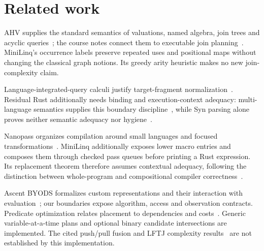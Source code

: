 \section{Related work}
\label{sec:related-work}
AHV supplies the standard semantics of valuations, named algebra, join trees
and acyclic queries~\cite{ahv}; the course notes connect them to executable
join planning~\cite{notes}. MiniLinq's occurrence labels preserve repeated
uses and positional maps without changing the classical graph notions.
Its greedy arity heuristic makes no new join-complexity claim.

Language-integrated-query calculi justify target-fragment
normalization~\cite{host-linq,host-effective}. Residual Rust additionally needs
binding and execution-context adequacy: multi-language semantics supplies this
boundary discipline~\cite{host-multilanguage}, while Syn parsing alone proves
neither semantic adequacy nor hygiene~\cite{host-hygiene}.

Nanopass organizes compilation around small languages and focused
transformations~\cite{paper-nanopass}. MiniLinq additionally exposes lower
macro entries and composes them through checked pass queues before printing
a Rust expression. Its replacement theorem
therefore assumes contextual adequacy, following the distinction between
whole-program and compositional compiler correctness~\cite{paper-ccc}.

Ascent BYODS formalizes custom representations and their interaction with
evaluation~\cite{paper-byods}; our boundaries expose algorithm, access and
observation contracts. Predicate optimization relates placement to dependencies
and costs~\cite{paper-udp}. Generic variable-at-a-time plans and optional binary
candidate intersections are implemented. The cited push/pull fusion and LFTJ
complexity results~\cite{paper-pushpull,paper-lftj} are not established by this
implementation.
